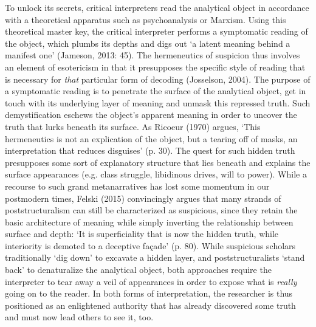 \begin{adjmulticols}{2}{0mm}{0mm}
To unlock its secrets, critical interpreters read the analytical object in accordance with a theoretical apparatus such as psychoanalysis or Marxism. Using this theoretical master key, the critical interpreter performs a symptomatic reading of the object, which plumbs its depths and digs out ‘a latent meaning behind a manifest one’ (Jameson, 2013: 45). The hermeneutics of suspicion thus involves an element of esotericism in that it presupposes the specific style of reading that is necessary for \textit{that} particular form of decoding (Josselson, 2004). The purpose of a symptomatic reading is to penetrate the surface of the analytical object, get in touch with its underlying layer of meaning and unmask this repressed truth. Such demystification eschews the object’s apparent meaning in order to uncover the truth that lurks beneath its surface. As Ricoeur (1970) argues, ‘This hermeneutics is not an explication of the object, but a tearing off of masks, an interpretation that reduces disguises’ (p. 30). The quest for such hidden truth presupposes some sort of explanatory structure that lies beneath and explains the surface appearances (e.g. class struggle, libidinous drives, will to power). While a recourse to such grand metanarratives has lost some momentum in our postmodern times, Felski (2015) convincingly argues that many strands of poststructuralism can still be characterized as suspicious, since they retain the basic architecture of meaning while simply inverting the relationship between surface and depth: ‘It is superficiality that is now the hidden truth, while interiority is demoted to a deceptive façade’ (p. 80). While suspicious scholars traditionally ‘dig down’ to excavate a hidden layer, and poststructuralists ‘stand back’ to denaturalize the analytical object, both approaches require the interpreter to tear away a veil of appearances in order to expose what is \textit{really} going on to the reader. In both forms of interpretation, the researcher is thus positioned as an enlightened authority that has already discovered some truth and must now lead others to see it, too.


\end{adjmulticols}
